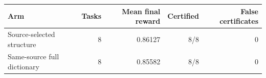 \begin{tabular}{lrrrr}
\toprule
Arm & Tasks & Mean final reward & Certified & False certificates\\
\midrule
Source-selected structure & 8 & 0.86127 & 8/8 & 0\\
Same-source full dictionary & 8 & 0.85582 & 8/8 & 0\\
\bottomrule
\end{tabular}
